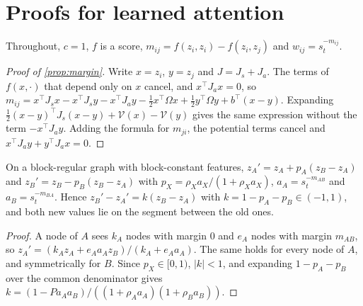 \section{Proofs for learned attention}\label{app:learned}

Throughout, $c=1$, $f$ is a score, $m_{ij}=f(z_i,z_i)-f(z_i,z_j)$ and $w_{ij}=s_t^{-m_{ij}}$.

\begin{proof}[Proof of \cref{prop:margin}]
Write $x=z_i$, $y=z_j$ and $J=J_s+J_a$. The terms of $f(x,\cdot)$ that depend only on $x$ cancel, and $x^\top J_ax=0$, so
$m_{ij}=x^\top J_sx-x^\top J_sy-x^\top J_ay-\frac12x^\top\Omega x+\frac12y^\top\Omega y+b^\top(x-y)$. Expanding
$\frac12(x-y)^\top J_s(x-y)+\mathcal V(x)-\mathcal V(y)$ gives the same expression without the term $-x^\top J_ay$. Adding the formula for $m_{ji}$, the potential
terms cancel and $x^\top J_ay+y^\top J_ax=0$.
\end{proof}

\begin{lemma}\label{lem:reduction-learned}
On a block-regular graph with block-constant features, $z_A'=z_A+p_A(z_B-z_A)$ and $z_B'=z_B-p_B(z_B-z_A)$ with $p_X=\rho_Xa_X/(1+\rho_Xa_X)$,
$a_A=s_t^{-m_{AB}}$ and $a_B=s_t^{-m_{BA}}$. Hence $z_B'-z_A'=k(z_B-z_A)$ with $k=1-p_A-p_B\in(-1,1)$, and both new values lie on the segment
between the old ones.
\end{lemma}

\begin{proof}
A node of $A$ sees $k_A$ nodes with margin $0$ and $e_A$ nodes with margin $m_{AB}$, so $z_A'=(k_Az_A+e_Aa_Az_B)/(k_A+e_Aa_A)$. The same holds for
every node of $A$, and symmetrically for $B$. Since $p_X\in[0,1)$, $|k|<1$, and expanding $1-p_A-p_B$ over the common denominator gives
$k=(1-Pa_Aa_B)/((1+\rho_Aa_A)(1+\rho_Ba_B))$.
\end{proof}

